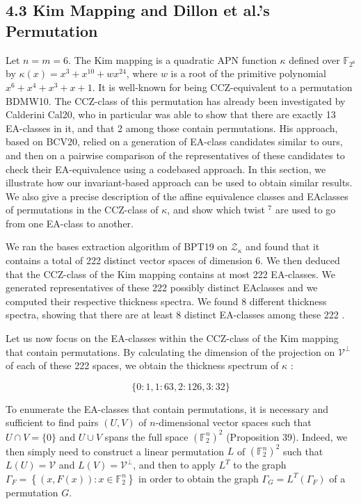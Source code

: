 \documentclass[10pt]{article}
\begin{document}
\subsection*{4.3 Kim Mapping and Dillon et al.'s Permutation}
Let $n=m=6$. The Kim mapping is a quadratic APN function $\kappa$ defined over $\mathbb{F}_{2^{6}}$ by $\kappa(x)= x^{3}+x^{10}+w x^{24}$, where $w$ is a root of the primitive polynomial $x^{6}+x^{4}+x^{3}+x+1$. It is well-known for being CCZ-equivalent to a permutation BDMW10. The CCZ-class of this permutation has already been investigated by Calderini Cal20, who in particular was able to show that there are exactly 13 EA-classes in it, and that 2 among those contain permutations. His approach, based on BCV20, relied on a generation of EA-class candidates similar to ours, and then on a pairwise comparison of the representatives of these candidates to check their EA-equivalence using a codebased approach. In this section, we illustrate how our invariant-based approach can be used to obtain similar results. We also give a precise description of the affine equivalence classes and EAclasses of permutations in the CCZ-class of $\kappa$, and show which twist ${ }^{7}$ are used to go from one EA-class to another.

We ran the bases extraction algorithm of BPT19 on $\mathcal{Z}_{\kappa}$ and found that it contains a total of 222 distinct vector spaces of dimension 6. We then deduced that the CCZ-class of the Kim mapping contains at most 222 EA-classes. We generated representatives of these 222 possibly distinct EAclasses and we computed their respective thickness spectra. We found 8 different thickness spectra, showing that there are at least 8 distinct EA-classes among these 222 .

Let us now focus on the EA-classes within the CCZ-class of the Kim mapping that contain permutations. By calculating the dimension of the projection on $\mathcal{V}^{\perp}$ of each of these 222 spaces, we obtain the thickness spectrum of $\kappa$ :

$$
\{0: 1,1: 63,2: 126,3: 32\}
$$

To enumerate the EA-classes that contain permutations, it is necessary and sufficient to find pairs $(U, V)$ of $n$-dimensional vector spaces such that $U \cap V=\{0\}$ and $U \cup V$ spans the full space $\left(\mathbb{F}_{2}^{n}\right)^{2}$ (Proposition 39). Indeed, we then simply need to construct a linear permutation $L$ of $\left(\mathbb{F}_{2}^{n}\right)^{2}$ such that $L(U)=\mathcal{V}$ and $L(V)=\mathcal{V}^{\perp}$, and then to apply $L^{T}$ to the graph $\Gamma_{F}=\left\{(x, F(x)): x \in \mathbb{F}_{2}^{n}\right\}$ in order to obtain the graph $\Gamma_{G}=L^{T}\left(\Gamma_{F}\right)$ of a permutation $G$.
\end{document}
